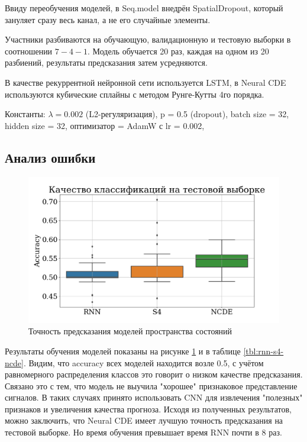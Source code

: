 \documentclass[a4paper, 12pt]{article}
\begin{document}
	Ввиду переобучения моделей, в Seq.model внедрён SpatialDropout, который зануляет сразу весь канал, а не его случайные элементы.
	
	Участники разбиваются на обучающую, валидационную и тестовую выборки в соотношении $7-4-1$. Модель обучается 20 раз, каждая на одном из 20 разбиений, результаты предсказания затем усредняются.
	
	В качестве рекуррентной нейронной сети используется LSTM, в Neural CDE используются кубические сплайны с методом Рунге-Кутты 4го порядка. 
	
	Константы: $\lambda = 0.002$ (L2-регуляризация), p = 0.5 (dropout), batch size = 32, hidden size = 32, оптимизатор = AdamW с lr = 0.002, 
	
	\subsection{Анализ ошибки}
	\begin{figure}[bhtp]
		\includegraphics[width=\textwidth]{rnn-s4-ncde.png}
		\caption{Точность предсказания моделей пространства состояний}
		\label{fig:accuracy-analysis}
	\end{figure}

	Результаты обучения моделей показаны на рисунке \ref{fig:accuracy-analysis} и в  таблице \ref{tbl:rnn-s4-ncde}. Видим, что accuracy всех моделей находится возле 0.5, с учётом равномерного распределения классов это говорит о низком качестве предсказания. Связано это с тем, что модель не выучила "хорошее" признаковое представление сигналов. В таких случаях принято использовать CNN для извлечения "полезных" признаков и увеличения качества прогноза.
	Исходя из полученных результатов, можно заключить, что Neural CDE имеет лучшую точность предсказания на тестовой выборке. Но время обучения превышает время RNN почти в 8 раз.
\end{document}
